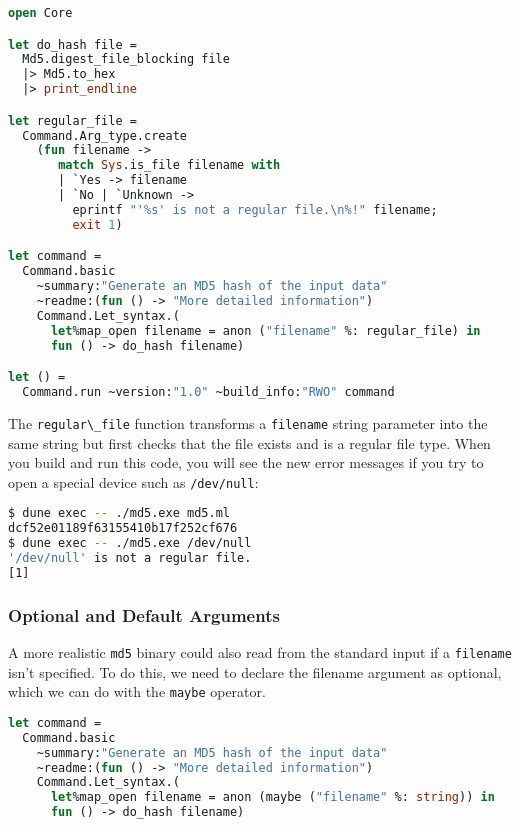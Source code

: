 \begin{lstlisting}[language=Caml]
open Core

let do_hash file =
  Md5.digest_file_blocking file
  |> Md5.to_hex
  |> print_endline

let regular_file =
  Command.Arg_type.create
    (fun filename ->
       match Sys.is_file filename with
       | `Yes -> filename
       | `No | `Unknown ->
         eprintf "'%s' is not a regular file.\n%!" filename;
         exit 1)

let command =
  Command.basic
    ~summary:"Generate an MD5 hash of the input data"
    ~readme:(fun () -> "More detailed information")
    Command.Let_syntax.(
      let%map_open filename = anon ("filename" %: regular_file) in
      fun () -> do_hash filename)

let () =
  Command.run ~version:"1.0" ~build_info:"RWO" command
\end{lstlisting}

The \passthrough{\lstinline!regular\_file!} function transforms a
\passthrough{\lstinline!filename!} string parameter into the same string
but first checks that the file exists and is a regular file type. When
you build and run this code, you will see the new error messages if you
try to open a special device such as
\passthrough{\lstinline!/dev/null!}:

\begin{lstlisting}[language=bash]
$ dune exec -- ./md5.exe md5.ml
dcf52e01189f63155410b17f252cf676
$ dune exec -- ./md5.exe /dev/null
'/dev/null' is not a regular file.
[1]
\end{lstlisting}

\hypertarget{optional-and-default-arguments}{%
\subsubsection{Optional and Default
Arguments}\label{optional-and-default-arguments}}

A more realistic \passthrough{\lstinline!md5!} binary could also read
from the standard input if a \passthrough{\lstinline!filename!} isn't
specified. To do this, we need to declare the filename argument as
optional, which we can do with the \passthrough{\lstinline!maybe!}
operator.

\begin{lstlisting}[language=Caml]
let command =
  Command.basic
    ~summary:"Generate an MD5 hash of the input data"
    ~readme:(fun () -> "More detailed information")
    Command.Let_syntax.(
      let%map_open filename = anon (maybe ("filename" %: string)) in
      fun () -> do_hash filename)
\end{lstlisting}

